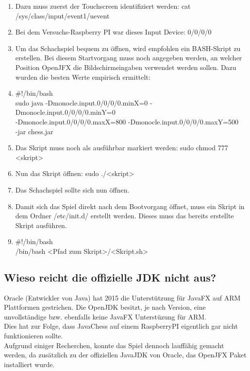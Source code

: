 \documentclass[12pt,a4paper]{article}
\begin{document}
\begin{enumerate}
	\item{Dazu muss zuerst der Touchscreen identifiziert werden: cat /sys/class/input/event1/uevent}
	\item{Bei dem Versuchs-Raspberry PI war dieses Input Device: 0/0/0/0}
	\item{Um das Schachspiel bequem zu öffnen, wird empfohlen ein BASH-Skript zu erstellen. Bei diesem Startvorgang muss noch angegeben werden, an welcher Position OpenJFX die Bildschirmeingaben verwendet werden sollen. Dazu wurden die besten Werte empirisch ermittelt:}
	\item{\#!/bin/bash \\
	sudo java -Dmonocle.input.0/0/0/0.minX=0 -Dmonocle.input.0/0/0/0.minY=0 \\
	-Dmonocle.input.0/0/0/0.maxX=800 -Dmonocle.input.0/0/0/0.maxY=500 \\
	-jar chess.jar
	}
	\item{Das Skript muss noch als ausführbar markiert werden: sudo chmod 777 <skript>}
	\item{Nun das Skript öffnen: sudo ./<skript>}
	\item{Das Schachspiel sollte sich nun öffnen.}
	\item{Damit sich das Spiel direkt nach dem Bootvorgang öffnet, muss ein Skript in dem Ordner /etc/init.d/ erstellt werden. Dieses muss das bereits erstellte Skript ausführen.}
	\item{\#!/bin/bash \\
	/bin/bash <Pfad zum Skript>/<Skript.sh>}
\end{enumerate}

\newpage
\subsection{Wieso reicht die offizielle JDK nicht aus?}

Oracle (Entwickler von Java) hat 2015 die Unterstützung für JavaFX auf \ac{ARM} Plattformen gestrichen. Die OpenJDK besitzt, je nach Version, eine unvollständige bzw. ebenfalls keine JavaFX Unterstüzung für ARM. \\
Dies hat zur Folge, dass JavaChess auf einem RaspberryPI eigentlich gar nicht funktionieren sollte. \\
Aufgrund einiger Recherchen, konnte das Spiel dennoch lauffähig gemacht werden, da zusätzlich zu der offiziellen JavaJDK von Oracle, das OpenJFX Paket installiert wurde. \\
 \\
\end{document}
